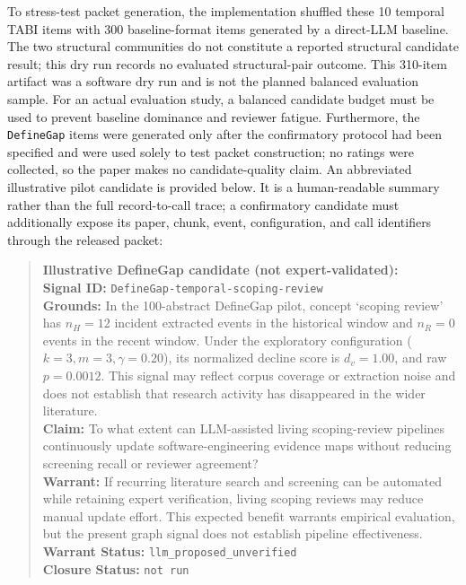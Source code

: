 \documentclass[runningheads]{llncs}
\begin{document}
To stress-test packet generation, the implementation shuffled these 10 temporal TABI items with 300 baseline-format items generated by a direct-LLM baseline. The two structural communities do not constitute a reported structural candidate result; this dry run records no evaluated structural-pair outcome. This 310-item artifact was a software dry run and is not the planned balanced evaluation sample. For an actual evaluation study, a balanced candidate budget must be used to prevent baseline dominance and reviewer fatigue. Furthermore, the \texttt{DefineGap} items were generated only after the confirmatory protocol had been specified and were used solely to test packet construction; no ratings were collected, so the paper makes no candidate-quality claim. An abbreviated illustrative pilot candidate is provided below. It is a human-readable summary rather than the full record-to-call trace; a confirmatory candidate must additionally expose its paper, chunk, event, configuration, and call identifiers through the released packet:
\begin{quote}\scriptsize
\textbf{Illustrative DefineGap candidate (not expert-validated):}\\
\textbf{Signal ID:} \texttt{DefineGap-temporal-scoping-review}\\
\textbf{Grounds:} In the 100-abstract DefineGap pilot, concept `scoping review' has $n_H = 12$ incident extracted events in the historical window and $n_R = 0$ events in the recent window. Under the exploratory configuration ($k=3, m=3, \gamma=0.20$), its normalized decline score is $d_v = 1.00$, and raw $p = 0.0012$. This signal may reflect corpus coverage or extraction noise and does not establish that research activity has disappeared in the wider literature.\\
\textbf{Claim:} To what extent can LLM-assisted living scoping-review pipelines continuously update software-engineering evidence maps without reducing screening recall or reviewer agreement?\\
\textbf{Warrant:} If recurring literature search and screening can be automated while retaining expert verification, living scoping reviews may reduce manual update effort. This expected benefit warrants empirical evaluation, but the present graph signal does not establish pipeline effectiveness.\\
\textbf{Warrant Status:} \texttt{llm\_proposed\_unverified}\\
\textbf{Closure Status:} \texttt{not run}
\end{quote}
\end{document}
